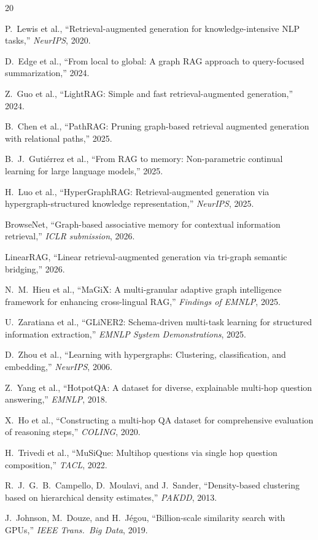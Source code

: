\documentclass[11pt,a4paper]{article}
\begin{document}

\begin{thebibliography}{20}

P.~Lewis et al., ``Retrieval-augmented generation for knowledge-intensive NLP tasks,'' \textit{NeurIPS}, 2020.

D.~Edge et al., ``From local to global: A graph RAG approach to query-focused summarization,'' 2024.

Z.~Guo et al., ``LightRAG: Simple and fast retrieval-augmented generation,'' 2024.

B.~Chen et al., ``PathRAG: Pruning graph-based retrieval augmented generation with relational paths,'' 2025.

B.~J.~Guti\'errez et al., ``From RAG to memory: Non-parametric continual learning for large language models,'' 2025.

H.~Luo et al., ``HyperGraphRAG: Retrieval-augmented generation via hypergraph-structured knowledge representation,'' \textit{NeurIPS}, 2025.

BrowseNet, ``Graph-based associative memory for contextual information retrieval,'' \textit{ICLR submission}, 2026.

LinearRAG, ``Linear retrieval-augmented generation via tri-graph semantic bridging,'' 2026.

N.~M.~Hieu et al., ``MaGiX: A multi-granular adaptive graph intelligence framework for enhancing cross-lingual RAG,'' \textit{Findings of EMNLP}, 2025.

U.~Zaratiana et al., ``GLiNER2: Schema-driven multi-task learning for structured information extraction,'' \textit{EMNLP System Demonstrations}, 2025.

D.~Zhou et al., ``Learning with hypergraphs: Clustering, classification, and embedding,'' \textit{NeurIPS}, 2006.

Z.~Yang et al., ``HotpotQA: A dataset for diverse, explainable multi-hop question answering,'' \textit{EMNLP}, 2018.

X.~Ho et al., ``Constructing a multi-hop QA dataset for comprehensive evaluation of reasoning steps,'' \textit{COLING}, 2020.

H.~Trivedi et al., ``MuSiQue: Multihop questions via single hop question composition,'' \textit{TACL}, 2022.

R.~J.~G.~B.~Campello, D.~Moulavi, and J.~Sander, ``Density-based clustering based on hierarchical density estimates,'' \textit{PAKDD}, 2013.

J.~Johnson, M.~Douze, and H.~J\'egou, ``Billion-scale similarity search with GPUs,'' \textit{IEEE Trans.\ Big Data}, 2019.

\end{thebibliography}
\end{document}
